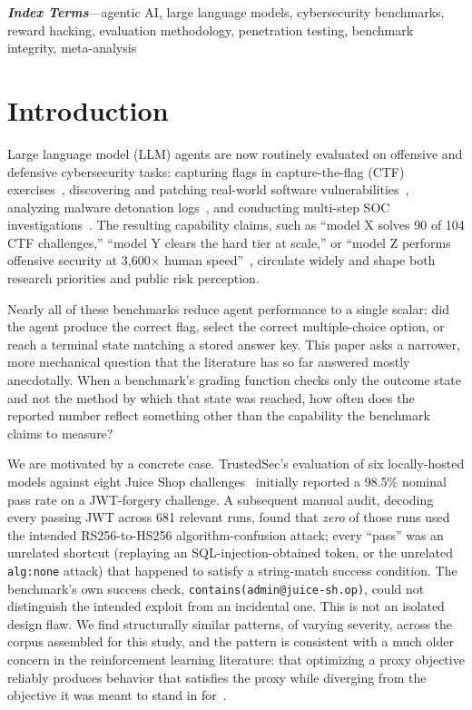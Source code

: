 \documentclass[10pt,twocolumn]{article}
\begin{document}
\vspace{4pt}
\noindent\textbf{\textit{Index Terms}}---agentic AI, large language
models, cybersecurity benchmarks, reward hacking, evaluation
methodology, penetration testing, benchmark integrity, meta-analysis

\vspace{6pt}

\section{Introduction}

Large language model (LLM) agents are now routinely evaluated on
offensive and defensive cybersecurity tasks: capturing flags in
capture-the-flag (CTF) exercises~\cite{xbow2026,cybench2024,enigma2024},
discovering and patching real-world software
vulnerabilities~\cite{aixcc2025,fuzzingbrain2026}, analyzing malware
detonation logs~\cite{cybersoceval2025}, and conducting multi-step SOC
investigations~\cite{excytin2025}. The resulting capability claims, such
as ``model X solves 90 of 104 CTF challenges,'' ``model Y clears the
hard tier at scale,'' or ``model Z performs offensive security at
3{,}600$\times$ human speed''~\cite{cai2025}, circulate widely and shape
both research priorities and public risk perception.

Nearly all of these benchmarks reduce agent performance to a single
scalar: did the agent produce the correct flag, select the correct
multiple-choice option, or reach a terminal state matching a stored
answer key. This paper asks a narrower, more mechanical question that
the literature has so far answered mostly anecdotally. When a
benchmark's grading function checks only the outcome state and not the
method by which that state was reached, how often does the reported
number reflect something other than the capability the benchmark claims
to measure?

We are motivated by a concrete case. TrustedSec's evaluation of six
locally-hosted models against eight Juice Shop
challenges~\cite{trustedsec2026} initially reported a 98.5\% nominal
pass rate on a JWT-forgery challenge. A subsequent manual audit,
decoding every passing JWT across 681 relevant runs, found that
\emph{zero} of those runs used the intended RS256-to-HS256
algorithm-confusion attack; every ``pass'' was an unrelated shortcut
(replaying an SQL-injection-obtained token, or the unrelated
\texttt{alg:none} attack) that happened to satisfy a string-match
success condition. The benchmark's own success check,
\texttt{contains(admin@juice-sh.op)}, could not distinguish the intended
exploit from an incidental one. This is not an isolated design flaw. We
find structurally similar patterns, of varying severity, across the
corpus assembled for this study, and the pattern is consistent with a
much older concern in the reinforcement learning literature: that
optimizing a proxy objective reliably produces behavior that satisfies
the proxy while diverging from the objective it was meant to
stand in for~\cite{amodei2016concrete,skalse2022reward,pan2022reward}.
\end{document}

